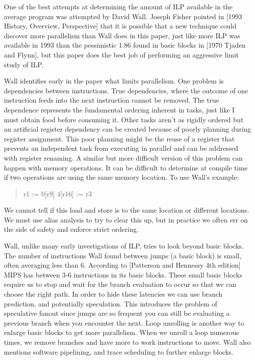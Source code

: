 \documentclass[12pt,twoside,letterpaper]{article}
\begin{document}
One of the best attempts at determining the amount of ILP available in the average program was attempted by David Wall. Joseph Fisher pointed in [1993 History, Overview, Perspective] that it is possible that a new technique could discover more parallelism than Wall does in this paper, just like more ILP was available in 1993 than the pessimistic 1.86 found in basic blocks in [1970 Tjaden and Flynn], but this paper does the best job of performing an aggressive limit study of ILP.

Wall identifies early in the paper what limits parallelism. One problem is dependencies between instructions. True dependencies, where the outcome of one instruction feeds into the next instruction cannot be removed. The true dependence represents the fundamental ordering inherent in tasks, just like I must obtain food before consuming it. Other tasks aren't as rigidly ordered but an artificial register dependency can be created because of poorly planning during register assignment. This poor planning might be the reuse of a register that prevents an independent task from executing in parallel and can be addressed with register renaming. A similar but more difficult version of this problem can happen with memory operations. It can be difficult to determine at compile time if two operations are using the same memory location. To use Wall’s example:

\begin{quote}
r1 := 0[r9]
4[r16] := r3
\end{quote}

We cannot tell if this load and store is to the same location or different locations. We must use alias analysis to try to clear this up, but in practice we often err on the side of safety and enforce strict ordering.

Wall, unlike many early investigations of ILP, tries to look beyond basic blocks. The number of instructions Wall found between jumps (a basic block) is small, often averaging less than 6. According to [Patterson and Hennessy 4th edition] MIPS has between 3-6 instructions in its basic blocks. These small basic blocks require us to stop and wait for the branch evaluation to occur so that we can choose the right path. In order to hide these latencies we can use branch prediction, and potentially speculation. This introduces the problem of speculative fanout since jumps are so frequent you can still be evaluating a previous branch when you encounter the next. Loop unrolling is another way to enlarge basic blocks to get more parallelism. When we unroll a loop numerous times, we remove branches and have more to work instructions to move. Wall also mentions software pipelining, and trace scheduling to further enlarge blocks.
\end{document}
